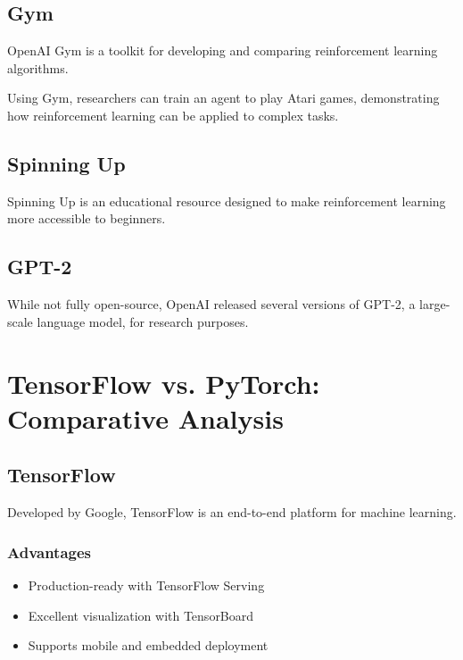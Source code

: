 \documentclass[
]{article}
\begin{document}
\subsection{Gym}

OpenAI Gym is a toolkit for developing and comparing reinforcement
learning algorithms.

\begin{example}
Using Gym, researchers can train an agent to play Atari games, demonstrating how reinforcement learning can be applied to complex tasks.
\end{example}

\subsection{Spinning Up}

Spinning Up is an educational resource designed to make reinforcement
learning more accessible to beginners.

\subsection{GPT-2}

While not fully open-source, OpenAI released several versions of GPT-2,
a large-scale language model, for research purposes.

\section{TensorFlow vs. PyTorch: Comparative Analysis}

\subsection{TensorFlow}

Developed by Google, TensorFlow is an end-to-end platform for machine
learning.

\subsubsection{Advantages}
\begin{itemize}
    \item Production-ready with TensorFlow Serving
    \item Excellent visualization with TensorBoard
    \item Supports mobile and embedded deployment
\end{itemize}
\end{document}
